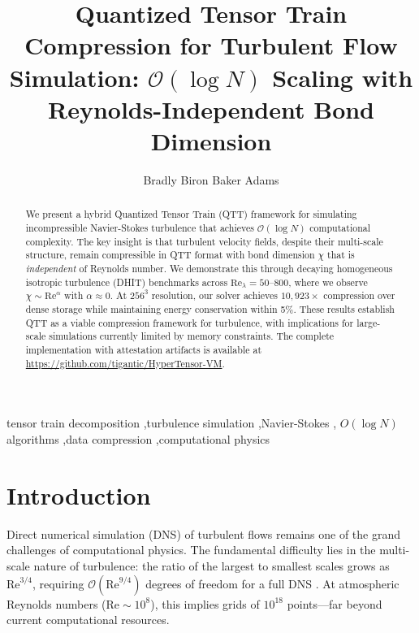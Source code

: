 \documentclass[preprint,12pt,authoryear]{elsarticle}
\newcommand{\bigO}{\mathcal{O}}
\theoremstyle{definition}
\begin{document}
\begin{frontmatter}

\title{Quantized Tensor Train Compression for Turbulent Flow Simulation:
$\bigO(\log N)$ Scaling with Reynolds-Independent Bond Dimension}

\author[tigantic]{Bradly Biron Baker Adams}
\address[tigantic]{Tigantic Holdings LLC}

\begin{abstract}
We present a hybrid Quantized Tensor Train (QTT) framework for simulating incompressible Navier-Stokes turbulence that achieves $\bigO(\log N)$ computational complexity. 
The key insight is that turbulent velocity fields, despite their multi-scale structure, remain compressible in QTT format with bond dimension $\chi$ that is \emph{independent} of Reynolds number.
We demonstrate this through decaying homogeneous isotropic turbulence (DHIT) benchmarks across $\mathrm{Re}_\lambda = 50$--$800$, where we observe $\chi \sim \mathrm{Re}^\alpha$ with $\alpha \approx 0$.
At $256^3$ resolution, our solver achieves $10{,}923\times$ compression over dense storage while maintaining energy conservation within 5\%.
These results establish QTT as a viable compression framework for turbulence, with implications for large-scale simulations currently limited by memory constraints.
The complete implementation with attestation artifacts is available at \url{https://github.com/tigantic/HyperTensor-VM}.
\end{abstract}

\begin{keyword}
tensor train decomposition \sep turbulence simulation \sep Navier-Stokes \sep
$O(\log N)$ algorithms \sep data compression \sep computational physics
\end{keyword}

\end{frontmatter}

\linenumbers

\section{Introduction}
\label{sec:intro}

Direct numerical simulation (DNS) of turbulent flows remains one of the grand challenges of computational physics.
The fundamental difficulty lies in the multi-scale nature of turbulence: the ratio of the largest to smallest scales grows as $\mathrm{Re}^{3/4}$, requiring $\bigO(\mathrm{Re}^{9/4})$ degrees of freedom for a full DNS \citep{pope2000turbulent}.
At atmospheric Reynolds numbers ($\mathrm{Re} \sim 10^8$), this implies grids of $10^{18}$ points---far beyond current computational resources.
\end{document}
